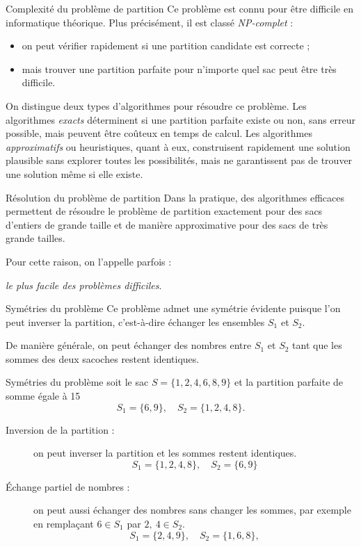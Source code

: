 \documentclass[a4paper,twoside]{article}
\begin{document}
  \begin{definition}{Complexité du problème de partition}
    Ce problème est connu pour être difficile en informatique théorique.
    Plus précisément, il est classé \emph{NP-complet} :
    \begin{itemize}
    \item on peut vérifier rapidement si une partition candidate est correcte ;
    \item mais trouver une partition parfaite pour n'importe quel sac peut être très difficile.
    \end{itemize}
  \end{definition}

  On distingue deux types d'algorithmes pour résoudre ce problème.
  Les algorithmes \emph{exacts} déterminent si une partition parfaite existe ou non, sans erreur possible, mais peuvent être coûteux en temps de calcul.
  Les algorithmes \emph{approximatifs} ou heuristiques, quant à eux, construisent rapidement une solution plausible sans explorer toutes les possibilités, mais ne garantissent pas de trouver une solution même si elle existe.

    \begin{remarque}{Résolution du problème de partition}
      Dans la pratique, des algorithmes efficaces permettent de résoudre le problème de partition exactement pour des sacs d'entiers de grande taille et de manière approximative pour des sacs de très grande tailles.

      Pour cette raison, on l'appelle parfois :
      \begin{center}
        \emph{le plus facile des problèmes difficiles}.
      \end{center}
  \end{remarque}


\begin{remarque}{Symétries du problème}
    Ce problème admet une symétrie évidente puisque l'on peut inverser la partition, c'est-à-dire échanger les ensembles $S_1$ et $S_2$.

    De manière générale, on peut échanger des nombres entre $S_1$ et $S_2$ tant que les sommes des deux sacoches restent identiques.
  \end{remarque}

  \begin{exemple}{Symétries du problème}
    soit le sac $S = \{1, 2, 4, 6, 8, 9\}$ et la partition parfaite de somme égale à 15
    $$S_1 = \{6, 9\}, \quad S_2 = \{1, 2, 4, 8\}.$$

    \begin{description}
    \item[Inversion de la partition :] on peut inverser la partition et les sommes restent identiques.
      $$S_1 = \{1, 2, 4, 8\}, \quad S_2 = \{6, 9\}$$

    \item[Échange partiel de nombres :] on peut aussi échanger des nombres sans changer les sommes, par exemple en remplaçant $6 \in S_1$ par $2,\ 4 \in S_2$.
      $$S_1 = \{2, 4, 9\}, \quad S_2 = \{1, 6, 8\},$$
      \end{description}
  \end{exemple}
\end{document}
